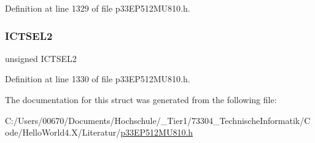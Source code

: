 Definition at line 1329 of file p33\+E\+P512\+M\+U810.\+h.

\mbox{\label{structtag_i_c15_c_o_n1_b_i_t_s_a47d80892d449e6edbd5ba2ba9ff06deb}} 
\subsubsection{\texorpdfstring{I\+C\+T\+S\+E\+L2}{ICTSEL2}}
{\footnotesize\ttfamily unsigned I\+C\+T\+S\+E\+L2}



Definition at line 1330 of file p33\+E\+P512\+M\+U810.\+h.



The documentation for this struct was generated from the following file\+:\begin{DoxyCompactItemize}
\item 
C\+:/\+Users/00670/\+Documents/\+Hochschule/\+\_\+\+Tier1/73304\+\_\+\+Technische\+Informatik/\+Code/\+Hello\+World4.\+X/\+Literatur/\hyperlink{p33_e_p512_m_u810_8h}{p33\+E\+P512\+M\+U810.\+h}\end{DoxyCompactItemize}
